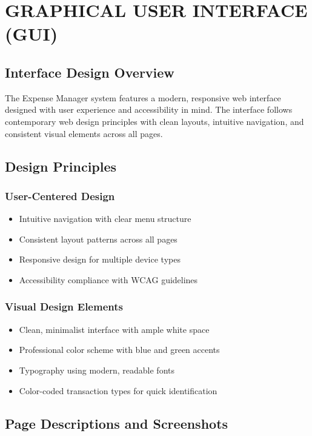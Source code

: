 \chapter{GRAPHICAL USER INTERFACE (GUI)}

\section{Interface Design Overview}

The Expense Manager system features a modern, responsive web interface designed with user experience and accessibility in mind. The interface follows contemporary web design principles with clean layouts, intuitive navigation, and consistent visual elements across all pages.

\section{Design Principles}

\subsection{User-Centered Design}
\begin{itemize}
    \item Intuitive navigation with clear menu structure
    \item Consistent layout patterns across all pages
    \item Responsive design for multiple device types
    \item Accessibility compliance with WCAG guidelines
\end{itemize}

\subsection{Visual Design Elements}
\begin{itemize}
    \item Clean, minimalist interface with ample white space
    \item Professional color scheme with blue and green accents
    \item Typography using modern, readable fonts
    \item Color-coded transaction types for quick identification
\end{itemize}

\section{Page Descriptions and Screenshots}


